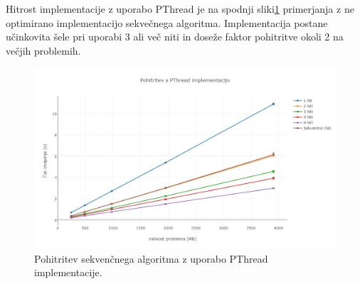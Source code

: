\documentclass[a4paper,11pt]{article}
\begin{document}
Hitrost implementacije z uporabo PThread je na spodnji sliki\ref{slika6} primerjanja z ne optimirano implementacijo sekvečnega algoritma. Implementacija postane učinkovita šele pri uporabi 3 ali več niti in doseže faktor pohitritve okoli 2 na večjih problemih.

\begin{figure}[htbp]
\begin{center}
\includegraphics[scale=0.4]{pthread-opt.png}
\caption{Pohitritev sekvenčnega algoritma z uporabo PThread implementacije.}
\label{slika6}
\end{center}
\end{figure}
\end{document}
